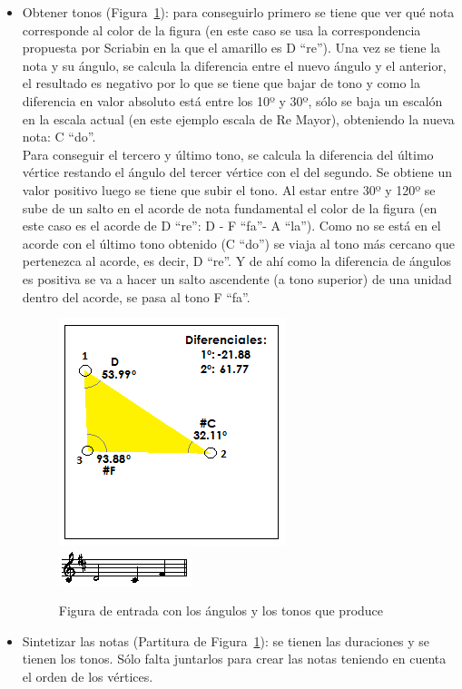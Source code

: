 \begin{itemize}
	\item Obtener tonos  (Figura~\ref{fig:Figura4Voz1}): para conseguirlo primero se tiene que ver qué nota corresponde al color de la figura (en este caso se usa la correspondencia propuesta por Scriabin en la que el amarillo es D ``re''). Una vez se tiene la nota y su ángulo, se calcula la diferencia entre el nuevo ángulo y el anterior, el resultado es negativo por lo que se tiene que bajar de tono y como la diferencia en valor absoluto está entre los 10º y 30º, sólo se baja un escalón en la escala actual (en este ejemplo escala de Re Mayor), obteniendo la nueva nota: C ``do''. \\
Para conseguir el tercero y último tono, se calcula la diferencia del último vértice restando el ángulo del tercer vértice con el del segundo. Se obtiene un valor positivo luego se tiene que subir el tono. Al estar entre 30º y 120º se sube de un salto en el acorde de nota fundamental el color de la figura (en este caso es el acorde de D ``re'': D - F ``fa''- A ``la''). Como no se está en el acorde con el último tono obtenido (C ``do'') se viaja al tono más cercano que pertenezca al acorde, es decir, D ``re''. Y de ahí como la diferencia de ángulos es positiva se va a hacer un salto ascendente (a tono superior) de una unidad dentro del acorde, se pasa al tono F ``fa''.
	
		\begin{figure}[!htbp]
		\centering
		\hspace*{0.0in}
		\includegraphics[scale=1.0]{graphics/simpletest1-F3.png}
		\includegraphics[scale=1.0]{graphics/simpletest1-MELpartitura.png}
		\caption{Figura de entrada con los ángulos y los tonos que produce}
		\label{fig:Figura4Voz1}
		\end{figure}

	\item Sintetizar las notas (Partitura de Figura~\ref{fig:Figura4Voz1}): se tienen las duraciones y se tienen los tonos. Sólo falta juntarlos para crear las notas teniendo en cuenta el orden de los vértices.\\

\end{itemize}

